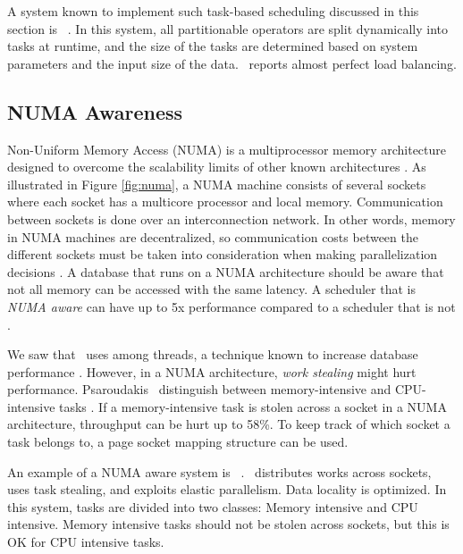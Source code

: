 A system known to implement such task-based scheduling discussed in this section is \hyrise~\cite{Schwalb2014-hn}. In this system, all partitionable operators are split dynamically into tasks at runtime, and the size of the tasks are determined based on system parameters and the input size of the data. \hyrise~reports almost perfect load balancing. 

\subsection{NUMA Awareness}
\label{sub:NUMA Awareness}
Non-Uniform Memory Access (NUMA) is a multiprocessor memory architecture designed to overcome the scalability limits of other known architectures \cite{Qlik2013-an}. As illustrated in Figure \ref{fig:numa}, a NUMA machine consists of several sockets where each socket has a multicore processor and local memory. Communication between sockets is done over an interconnection network. In other words, memory in NUMA machines are decentralized, so communication costs between the different sockets must be taken into consideration when making parallelization decisions \cite{Psaroudakis2015-lc}. A database that runs on a NUMA architecture should be aware that not all memory can be accessed with the same latency. A scheduler that is \textit{NUMA aware} can have up to 5x performance compared to a scheduler that is not \cite{Psaroudakis2015-lc}. 

We saw that \blink~uses  among threads, a technique known to increase database performance \cite{Barber2012-xt}. However, in a NUMA architecture, \textit{work stealing} might hurt performance. Psaroudakis \ea~distinguish between memory-intensive and CPU-intensive tasks \cite{Psaroudakis2015-lc}. If a memory-intensive task is stolen across a socket in a NUMA architecture, throughput can be hurt up to 58\%. To keep track of which socket a task belongs to, a page socket mapping structure can be used.

An example of a NUMA aware system is \hyper~\cite{Psaroudakis2014-ma, Psaroudakis2015-lc}. \hyper~distributes works across sockets,  uses task stealing, and exploits elastic parallelism. Data locality is optimized. In this system, tasks are divided into two classes: Memory intensive and CPU intensive. Memory intensive tasks should not be stolen across sockets, but this is OK for CPU intensive tasks.

